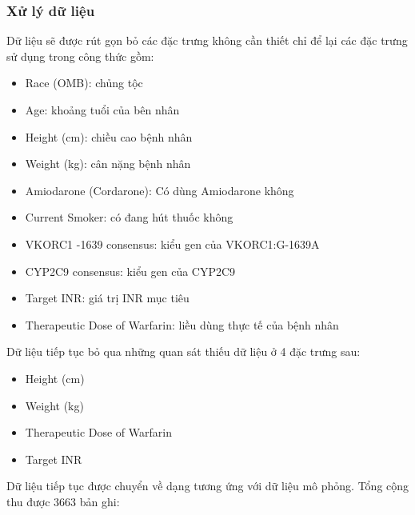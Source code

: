 \documentclass[14pt,oneside]{scrbook}
\providecommand{\tightlist}{\setlength{\itemsep}{\smallskipamount}\setlength{\parskip}{\smallskipamount}}
\begin{document}
\subsubsection{Xử lý dữ liệu}\label{xux1eed-luxfd-dux1eef-liux1ec7u-1}

Dữ liệu sẽ được rút gọn bỏ các đặc trưng không cần thiết chỉ để lại các
đặc trưng sử dụng trong công thức gồm:

\begin{itemize}
\tightlist
\item
  Race (OMB): chủng tộc
\item
  Age: khoảng tuổi của bên nhân
\item
  Height (cm): chiều cao bệnh nhân
\item
  Weight (kg): cân nặng bệnh nhân
\item
  Amiodarone (Cordarone): Có dùng Amiodarone không
\item
  Current Smoker: có đang hút thuốc không
\item
  VKORC1 -1639 consensus: kiểu gen của VKORC1:G-1639A
\item
  CYP2C9 consensus: kiểu gen của CYP2C9
\item
  Target INR: giá trị INR mục tiêu
\item
  Therapeutic Dose of Warfarin: liều dùng thực tế của bệnh nhân
\end{itemize}

Dữ liệu tiếp tục bỏ qua những quan sát thiếu dữ liệu ở 4 đặc trưng sau:

\begin{itemize}
\tightlist
\item
  Height (cm)
\item
  Weight (kg)
\item
  Therapeutic Dose of Warfarin
\item
  Target INR
\end{itemize}

Dữ liệu tiếp tục được chuyển về dạng tương ứng với dữ liệu mô phỏng.
Tổng cộng thu được 3663 bản ghi:
\end{document}
